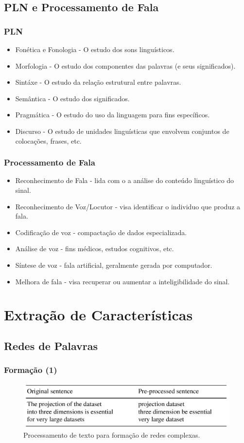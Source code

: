 \documentclass{beamer}
\begin{document}
    \subsection{PLN e Processamento de Fala}
    \frame
    {
      \frametitle{PLN}
        \begin{itemize}
          \item Fonética e Fonologia - O estudo dos sons linguísticos.
          \item Morfologia - O estudo dos componentes das palavras (e seus significados).
          \item Sintáxe - O estudo da relação estrutural entre palavras.
          \item Semântica - O estudo dos significados.
          \item Pragmática - O estudo do uso da linguagem para fins específicos.
          \item Discurso - O estudo de unidades linguísticas que envolvem conjuntos de colocações, frases, etc.
        \end{itemize}
    }
    \frame
    {
      \frametitle{Processamento de Fala}
        \begin{itemize}
        \item Reconhecimento de Fala - lida com o a análise do conteúdo linguístico do sinal.
        \item Reconhecimento de Voz/Locutor - visa identificar o individuo que produz a fala.
        \item Codificação de voz - compactação de dados especializada.
        \item Análise de voz - fins médicos, estudos cognitivos, etc.
        \item Síntese de voz - fala artificial, geralmente gerada por computador.
        \item Melhora de fala - visa recuperar ou aumentar a inteligibilidade do sinal.
        \end{itemize}
    }


  \section{Extração de Características}
    \frame{\tableofcontents[current]}
    \subsection{Redes de Palavras}
      \frame
      {
        \frametitle{Formação (1)}
      \begin{figure}[!h]
        \begin{center}
                \includegraphics[width=.8\textwidth]{sentencas-processadas}
        \end{center}
        \caption{Processamento de texto para formação de redes complexas.}
      \end{figure}
      }
\end{document}
